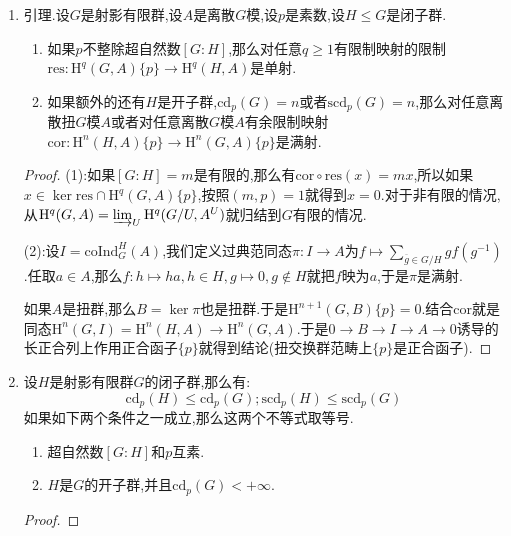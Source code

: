 \begin{enumerate}
\begin{enumerate}
\begin{proof}
			按照循环群的上同调,有$A_n=\mathrm{H}^2(\mathbb{Z}/p^n,\mathbb{Z}/p)=\mathbb{Z}/p$.但是$A_n\to A_{n+1}$是数乘$p$的映射,于是$\mathrm{H}^2(\mathbb{Z}_p,\mathbb{Z}/p)=\varinjlim_n\mathrm{H}^2(\mathbb{Z}/p^n,\mathbb{Z}/p)=0$.于是按照$\mathbb{Z}_p$是射影$p$群,得到$\mathrm{cd}_p(\mathbb{Z}_p)\le1$.又因为$\mathbb{Z}/p$是离散模,有:
			$$\mathrm{H}^1(\mathbb{Z}_p,\mathbb{Z}/p)=\mathrm{Hom}_{\mathrm{cont}}(\mathbb{Z}_p,\mathbb{Z}_p)=\mathrm{Hom}_{\mathrm{cont}}(\mathbb{Z}_p/p\mathbb{Z}_p,\mathbb{Z}/p)=\mathbb{Z}/p\not=0$$
		\end{proof}
		\item 对任意素数$p$有$\mathrm{cd}_p(\widehat{\mathbb{Z}})=1$.另外有$\mathrm{H}^2(G,\mathbb{Z})=\mathrm{H}^1(G,\mathbb{Q}/\mathbb{Z})=\mathbb{Q}/\mathbb{Z}$,于是$\mathrm{scd}_p(\widehat{\mathbb{Z}})=2$.
	\end{enumerate}
	\item 引理.设$G$是射影有限群,设$A$是离散$G$模,设$p$是素数,设$H\le G$是闭子群.
	\begin{enumerate}[(1)]
		\item 如果$p$不整除超自然数$[G:H]$,那么对任意$q\ge1$有限制映射的限制$\mathrm{res}:\mathrm{H}^q(G,A)\{p\}\to\mathrm{H}^q(H,A)$是单射.
		\item 如果额外的还有$H$是开子群,$\mathrm{cd}_p(G)=n$或者$\mathrm{scd}_p(G)=n$,那么对任意离散扭$G$模$A$或者对任意离散$G$模$A$有余限制映射$\mathrm{cor}:\mathrm{H}^n(H,A)\{p\}\to\mathrm{H}^n(G,A)\{p\}$是满射.
	\end{enumerate}
	\begin{proof}
		
		(1):如果$[G:H]=m$是有限的,那么有$\mathrm{cor}\circ\mathrm{res}(x)=mx$,所以如果$x\in\ker\mathrm{res}\cap\mathrm{H}^q(G,A)\{p\}$,按照$(m,p)=1$就得到$x=0$.对于非有限的情况,从$\mathrm{H}^q(G,A)=\varinjlim_U\mathrm{H}^q(G/U,A^U)$就归结到$G$有限的情况.
		
		\qquad
		
		(2):设$I=\mathrm{coInd}_G^H(A)$,我们定义过典范同态$\pi:I\to A$为$f\mapsto\sum_{\overline{g}\in G/H}gf(g^{-1})$.任取$a\in A$,那么$f:h\mapsto ha,h\in H,g\mapsto0,g\not\in H$就把$f$映为$a$,于是$\pi$是满射.
		
		\qquad
		
		如果$A$是扭群,那么$B=\ker\pi$也是扭群.于是$\mathrm{H}^{n+1}(G,B)\{p\}=0$.结合$\mathrm{cor}$就是同态$\mathrm{H}^n(G,I)=\mathrm{H}^n(H,A)\to\mathrm{H}^n(G,A)$.于是$0\to B\to I\to A\to0$诱导的长正合列上作用正合函子$\{p\}$就得到结论(扭交换群范畴上$\{p\}$是正合函子).
	\end{proof}
	\item 设$H$是射影有限群$G$的闭子群,那么有:
	$$\mathrm{cd}_p(H)\le\mathrm{cd}_p(G);\mathrm{scd}_p(H)\le\mathrm{scd}_p(G)$$
	如果如下两个条件之一成立,那么这两个不等式取等号.
	\begin{enumerate}[(1)]
		\item 超自然数$[G:H]$和$p$互素.
		\item $H$是$G$的开子群,并且$\mathrm{cd}_p(G)<+\infty$.
	\end{enumerate}
	\begin{proof}
		

\end{proof}
\end{enumerate}
